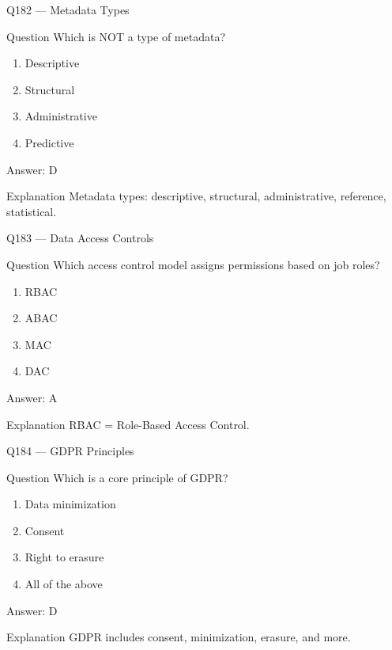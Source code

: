 \documentclass[aspectratio=169,8pt]{beamer}
\begin{document}
	\begin{frame}{Q182 --- Metadata Types}
		\begin{block}{Question}
			Which is NOT a type of metadata?
		\end{block}
		\begin{enumerate}
			\item Descriptive
			\item Structural
			\item Administrative
			\item Predictive
		\end{enumerate}
		\begin{exampleblock}{Answer: D}\end{exampleblock}
		\begin{block}{Explanation}
			Metadata types: descriptive, structural, administrative, reference, statistical.
		\end{block}
	\end{frame}
	
	\begin{frame}{Q183 --- Data Access Controls}
		\begin{block}{Question}
			Which access control model assigns permissions based on job roles?
		\end{block}
		\begin{enumerate}
			\item RBAC
			\item ABAC
			\item MAC
			\item DAC
		\end{enumerate}
		\begin{exampleblock}{Answer: A}\end{exampleblock}
		\begin{block}{Explanation}
			RBAC = Role-Based Access Control.
		\end{block}
	\end{frame}
	
	\begin{frame}{Q184 --- GDPR Principles}
		\begin{block}{Question}
			Which is a core principle of GDPR?
			\begin{enumerate}
				\item Data minimization
				\item Consent
				\item Right to erasure
				\item All of the above
			\end{enumerate}
		\end{block}
		\begin{exampleblock}{Answer: D}\end{exampleblock}
		\begin{block}{Explanation}
			GDPR includes consent, minimization, erasure, and more.
		\end{block}
	\end{frame}
	
\end{document}
